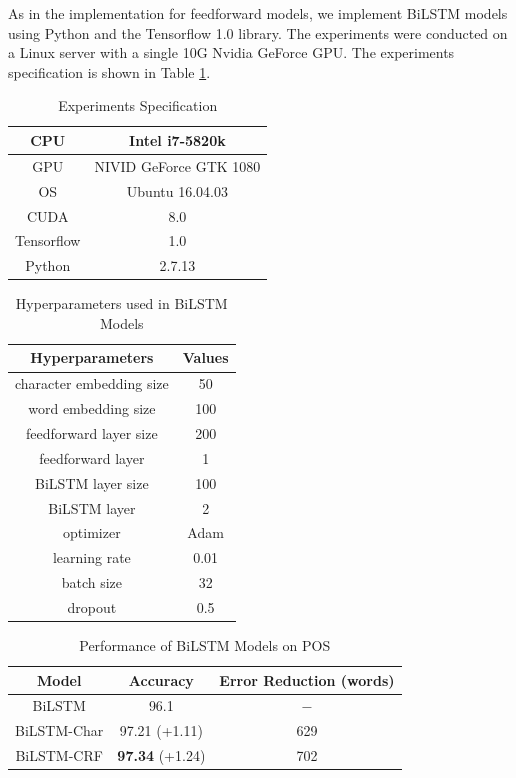 As in the implementation for feedforward models, we implement BiLSTM models using Python and the Tensorflow 1.0 library. The experiments were conducted on a Linux server with a single 10G Nvidia GeForce GPU. The experiments specification is shown in Table \ref{table:hardware}.


\begin{table}[]
\centering
\caption{Experiments Specification}
\label{table:hardware}
\begin{tabular}{|c|c|}
\hline
CPU & Intel i7-5820k \\ \hline
GPU & NIVID GeForce GTK 1080 \\ \hline
OS & Ubuntu 16.04.03 \\ \hline
CUDA & 8.0 \\ \hline
Tensorflow & 1.0 \\ \hline
Python & 2.7.13 \\ \hline
\end{tabular}
\end{table}

\begin{table}[]
\centering
\caption{Hyperparameters used in BiLSTM Models}
\label{table:hyperparameters2}
\begin{tabular}{|c|c|}
\hline
Hyperparameters & Values \\ \hline
character embedding size & 50 \\ \hline
word embedding size & 100 \\ \hline
feedforward layer size & 200 \\ \hline
feedforward layer & 1 \\ \hline
BiLSTM layer size & 100 \\ \hline
BiLSTM layer & 2 \\ \hline 
optimizer & Adam \\ \hline
learning rate & 0.01 \\ \hline
batch size & 32 \\ \hline
dropout & 0.5 \\ \hline
\end{tabular}
\end{table}

\begin{table}[]
\centering
\caption{Performance of BiLSTM Models on POS}
\label{table:lstm-table1}
\begin{tabular}{|c|c|c|}
\hline
Model         & Accuracy  & Error Reduction (words)      \\ \hline
BiLSTM  & 96.1     & $-$                            \\ \hline
BiLSTM-Char & 97.21 (+1.11) & 629             \\ \hline
BiLSTM-CRF & \textbf{97.34} (+1.24)  & 702             \\ \hline
\end{tabular}
\end{table}

